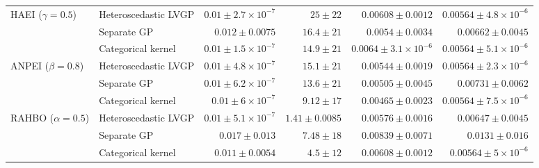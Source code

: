 \begin{table}[htbp]
\begin{tabular}{llrrrr}
\midrule
HAEI ($\gamma=0.5$) & Heteroscedastic LVGP & $0.01 \pm 2.7{\times}10^{-7}$ & $25 \pm 22$ & $0.00608 \pm 0.0012$ & {\boldmath$0.00564 \pm 4.8{\times}10^{-6}$} \\
 & Separate GP & $0.012 \pm 0.0075$ & $16.4 \pm 21$ & {\boldmath$0.0054 \pm 0.0034$} & $0.00662 \pm 0.0045$ \\
 & Categorical kernel & {\boldmath$0.01 \pm 1.5{\times}10^{-7}$} & {\boldmath$14.9 \pm 21$} & $0.0064 \pm 3.1{\times}10^{-6}$ & $0.00564 \pm 5.1{\times}10^{-6}$ \\
\midrule
ANPEI ($\beta=0.8$) & Heteroscedastic LVGP & $0.01 \pm 4.8{\times}10^{-7}$ & $15.1 \pm 21$ & $0.00544 \pm 0.0019$ & {\boldmath$0.00564 \pm 2.3{\times}10^{-6}$} \\
 & Separate GP & $0.01 \pm 6.2{\times}10^{-7}$ & $13.6 \pm 21$ & $0.00505 \pm 0.0045$ & $0.00731 \pm 0.0062$ \\
 & Categorical kernel & {\boldmath$0.01 \pm 6{\times}10^{-7}$} & {\boldmath$9.12 \pm 17$} & \colorbox{green!20}{{\boldmath$0.00465 \pm 0.0023$}} & $0.00564 \pm 7.5{\times}10^{-6}$ \\
\midrule
RAHBO ($\alpha=0.5$) & Heteroscedastic LVGP & {\boldmath$0.01 \pm 5.1{\times}10^{-7}$} & \colorbox{green!20}{{\boldmath$1.41 \pm 0.0085$}} & {\boldmath$0.00576 \pm 0.0016$} & $0.00647 \pm 0.0045$ \\
 & Separate GP & $0.017 \pm 0.013$ & $7.48 \pm 18$ & $0.00839 \pm 0.0071$ & $0.0131 \pm 0.016$ \\
 & Categorical kernel & $0.011 \pm 0.0054$ & $4.5 \pm 12$ & $0.00608 \pm 0.0012$ & {\boldmath$0.00564 \pm 5{\times}10^{-6}$} \\
\bottomrule
\end{tabular}
\end{table}
